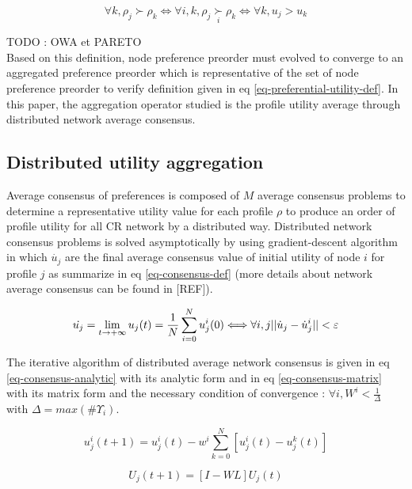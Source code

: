 \documentclass[conference]{IEEEtran}
\newcommand{\preferal}[1]{\underset{#1}{\succ}}
\begin{document}
\begin{equation}
\label{eq-preferential-utility-def}
\displaystyle
\forall k, \rho_j \succ \rho_k \Longleftrightarrow \forall i,k,  \rho_j \preferal{i} \rho_k \Longleftrightarrow \forall k, u_j > u_k
\end{equation}

TODO : OWA et PARETO\\

Based on this definition, node preference preorder must evolved to converge to an aggregated preference preorder which is representative of the set of node preference preorder to verify definition given in eq \ref{eq-preferential-utility-def}. In this paper, the aggregation operator studied is the profile utility average through distributed network average consensus.

\subsection{Distributed utility aggregation}
Average consensus of preferences is composed of $M$ average consensus problems to determine a representative utility value for each profile $\rho$ to produce an order of profile utility for all CR network by a distributed way. Distributed network consensus problems is solved asymptotically by using gradient-descent algorithm in which $\dot{u_j}$ are the final average consensus value of initial utility of node $i$ for profile $j$ as summarize in eq \ref{eq-consensus-def} (more details about network average consensus can be found in [REF]). 

\begin{equation}
\label{eq-consensus-def}
\displaystyle
\dot{u_j} =  \lim_{t \to +\infty } u_j(t)  =  {1 \over N } \sum_{i=0}^N u_j^i(0)  \Longleftrightarrow \forall i,j || \dot{u}_j - \dot{u}_j^i || < \varepsilon
\end{equation}

The iterative algorithm of distributed average network consensus is given in eq \ref{eq-consensus-analytic} with its analytic form and in eq \ref{eq-consensus-matrix} with its matrix form and the necessary condition of convergence : $\forall i, W^i < \frac{1}{\Delta}$ with $\Delta = max(\#\Upsilon_i)$.

\begin{equation}
\label{eq-consensus-analytic}
\displaystyle
u_j^i(t+1) = u_j^i(t) - w^i \sum_{k=0}^N[u_j^i(t) - u_j^k(t)]
\end{equation}

\begin{equation}
\label{eq-consensus-matrix}
\displaystyle
U_j(t+1) = [I-WL]U_j(t)
\end{equation}
\end{document}
